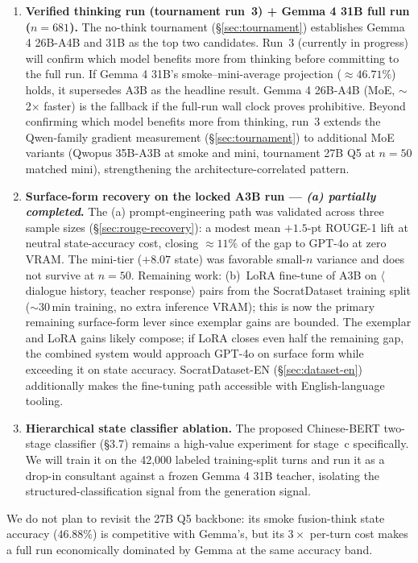 \documentclass[11pt]{article}
\begin{document}
\begin{enumerate}
    \item \textbf{Verified thinking run (tournament run~3) + Gemma 4 31B full run ($n{=}681$).} The no-think tournament (\S\ref{sec:tournament}) establishes Gemma 4 26B-A4B and 31B as the top two candidates. Run~3 (currently in progress) will confirm which model benefits more from thinking before committing to the full run. If Gemma 4 31B's smoke--mini-average projection ($\approx 46.71\%$) holds, it supersedes A3B as the headline result. Gemma 4 26B-A4B (MoE, $\sim$2$\times$ faster) is the fallback if the full-run wall clock proves prohibitive. Beyond confirming which model benefits more from thinking, run~3 extends the Qwen-family gradient measurement (\S\ref{sec:tournament}) to additional MoE variants (Qwopus 35B-A3B at smoke and mini, tournament 27B Q5 at $n{=}50$ matched mini), strengthening the architecture-correlated pattern.
    \item \textbf{Surface-form recovery on the locked A3B run --- \emph{(a) partially completed}.} The (a) prompt-engineering path was validated across three sample sizes (\S\ref{sec:rouge-recovery}): a modest mean $+1.5$-pt ROUGE-1 lift at neutral state-accuracy cost, closing $\approx 11\%$ of the gap to GPT-4o at zero VRAM. The mini-tier ($+8.07$ state) was favorable small-$n$ variance and does not survive at $n{=}50$. Remaining work: (b)~LoRA fine-tune of A3B on $\langle$dialogue history, teacher response$\rangle$ pairs from the SocratDataset training split ($\sim 30$\,min training, no extra inference VRAM); this is now the primary remaining surface-form lever since exemplar gains are bounded. The exemplar and LoRA gains likely compose; if LoRA closes even half the remaining gap, the combined system would approach GPT-4o on surface form while exceeding it on state accuracy. SocratDataset-EN (\S\ref{sec:dataset-en}) additionally makes the fine-tuning path accessible with English-language tooling.
    \item \textbf{Hierarchical state classifier ablation.} The proposed Chinese-BERT two-stage classifier (\S 3.7) remains a high-value experiment for stage~c specifically. We will train it on the 42{,}000 labeled training-split turns and run it as a drop-in consultant against a frozen Gemma 4 31B teacher, isolating the structured-classification signal from the generation signal.
\end{enumerate}

We do not plan to revisit the 27B Q5 backbone: its smoke fusion-think state accuracy ($46.88\%$) is competitive with Gemma's, but its $3\times$ per-turn cost makes a full run economically dominated by Gemma at the same accuracy band.
\end{document}
